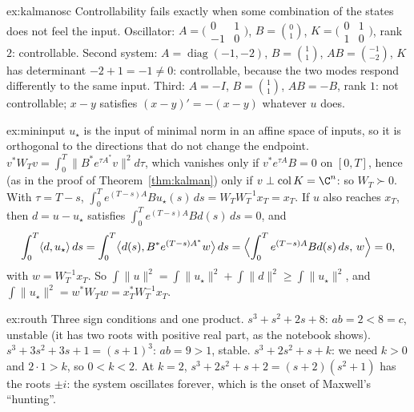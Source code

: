 \begin{solution}{ex:kalmanosc}
\idea Controllability fails exactly when some combination of the states does not feel the input.
\writeup Oscillator: $A=\bigl(\begin{smallmatrix}0&1\\-1&0\end{smallmatrix}\bigr)$, $B=\binom01$, $K=\bigl(\begin{smallmatrix}0&1\\1&0\end{smallmatrix}
\bigr)$, rank $2$: controllable. Second system: $A=\operatorname{diag}(-1,-2)$, $B=\binom11$, $AB=\binom{-1}{-2}$, $K$ has determinant $-2+1=-1\ne0$:
controllable, because the two modes respond differently to the same input. Third: $A=-I$, $B=\binom11$, $AB=-B$, rank $1$: not controllable;
$x-y$ satisfies $(x-y)'=-(x-y)$ whatever $u$ does.
\end{solution}

\begin{solution}{ex:mininput}
\idea $u_\star$ is the input of minimal norm in an affine space of inputs, so it is orthogonal to the directions that do not change the
endpoint.
\writeup $v^*W_Tv=\int_0^T\|B^*e^{\tau A^*}v\|^2d\tau$, which vanishes only if $v^*e^{\tau A}B=0$ on $[0,T]$, hence (as in the proof of
Theorem~\ref{thm:kalman}) only if $v\perp\operatorname{col}K=\C^n$: so $W_T\succ0$. With $\tau=T-s$, $\int_0^Te^{(T-s)A}Bu_\star(s)\,ds=W_TW_T^{-1}x_T=x_T$.
If $u$ also reaches $x_T$, then $d=u-u_\star$ satisfies $\int_0^Te^{(T-s)A}Bd(s)\,ds=0$, and
\[
\int_0^T\langle d,u_\star\rangle\,ds=\int_0^T\bigl\langle d(s),B^*e^{(T-s)A^*}w\bigr\rangle\,ds=\Bigl\langle\int_0^Te^{(T-s)A}Bd(s)\,ds,\,w\Bigr\rangle=0,
\]
with $w=W_T^{-1}x_T$. So $\int\|u\|^2=\int\|u_\star\|^2+\int\|d\|^2\ge\int\|u_\star\|^2$, and $\int\|u_\star\|^2=w^*W_Tw=x_T^*W_T^{-1}x_T$.
\end{solution}

\begin{solution}{ex:routh}
\idea Three sign conditions and one product.
\writeup $s^3+s^2+2s+8$: $ab=2<8=c$, unstable (it has two roots with positive real part, as the notebook shows). $s^3+3s^2+3s+1=(s+1)^3$:
$ab=9>1$, stable. $s^3+2s^2+s+k$: we need $k>0$ and $2\cdot1>k$, so $0<k<2$. At $k=2$, $s^3+2s^2+s+2=(s+2)(s^2+1)$ has the roots $\pm i$: the
system oscillates forever, which is the onset of Maxwell's ``hunting''.
\end{solution}

